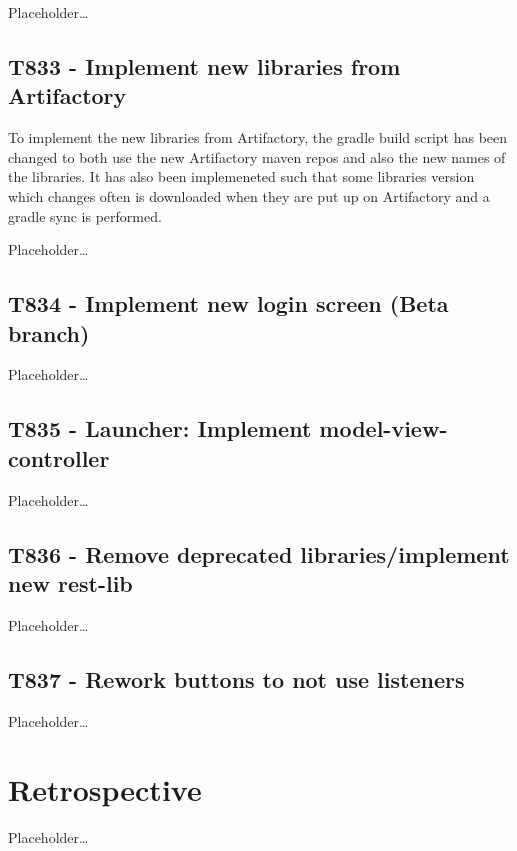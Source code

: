 Placeholder\ldots

\subsection{T833 - Implement new libraries from Artifactory}
To implement the new libraries from Artifactory, the gradle build script has
been changed to both use the new Artifactory maven repos and also the new names
of the libraries. It has also been implemeneted such that some libraries version
which changes often is downloaded when they are put up on Artifactory and a
gradle sync is performed.

Placeholder\ldots

\subsection{T834 - Implement new login screen (Beta branch)}
Placeholder\ldots

\subsection{T835 - Launcher: Implement model-view-controller}
Placeholder\ldots

\subsection{T836 - Remove deprecated libraries/implement new rest-lib}
Placeholder\ldots

\subsection{T837 - Rework buttons to not use listeners}
Placeholder\ldots

\section{Retrospective}
Placeholder\ldots